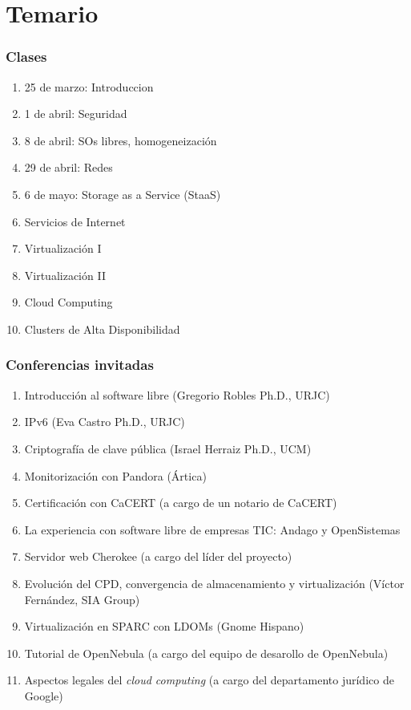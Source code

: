 \documentclass{beamer}
\begin{document}
\section{Temario}
\begin{frame}
\frametitle{Clases}
\begin{enumerate}
\item 25 de marzo: Introduccion
\item 1 de abril: Seguridad
\item 8 de abril: SOs libres, homogeneización
\item 29 de abril: Redes
\item 6 de mayo: Storage as a Service (StaaS)
\item Servicios de Internet
\item Virtualización I
\item Virtualización II
\item Cloud Computing
\item Clusters de Alta Disponibilidad
\end{enumerate}
\end{frame}


\begin{frame}
\frametitle{Conferencias invitadas}

\begin{enumerate}
\item Introducción al software libre (Gregorio Robles Ph.D., URJC)
\item IPv6 (Eva Castro Ph.D., URJC)
\item Criptografía de clave pública (Israel Herraiz Ph.D., UCM)
\item Monitorización con Pandora (Ártica)
\item Certificación con CaCERT (a cargo de un notario de CaCERT)
\item La experiencia con software libre de empresas TIC: Andago y OpenSistemas
\item Servidor web Cherokee (a cargo del líder del proyecto)
\item Evolución del CPD, convergencia de almacenamiento y virtualización (Víctor Fernández, SIA Group)
\item Virtualización en SPARC con LDOMs (Gnome Hispano)
\item Tutorial de OpenNebula (a cargo del equipo de desarollo de OpenNebula)
\item Aspectos legales del \textit{cloud computing} (a cargo del departamento jurídico de Google)
\end{enumerate}

\end{frame}
\end{document}
